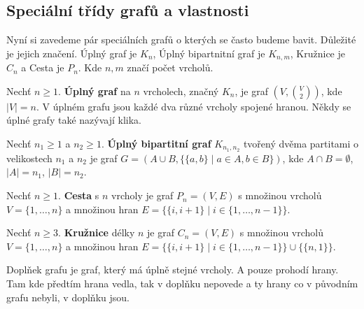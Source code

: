 \bigskip

\subsection{Speciální třídy grafů a vlastnosti}

Nyní si zavedeme pár speciálních grafů o kterých se často budeme bavit. Důležité je jejich značení. Úplný graf je $K_n$, Úplný bipartnitní graf je $K_{n,m}$, Kružnice je $C_n$ a Cesta je $P_n$. Kde $n,m$ značí počet vrcholů.

\medskip

\begin{definition}
Nechť $n \ge 1$. \textbf{Úplný graf} na $n$ vrcholech, značný $K_n$, je graf $(V, \binom{V}{2})$, kde $|V| = n$. V úplném grafu jsou každé dva různé vrcholy spojené hranou. Někdy se úplné grafy také nazývají klika.
\end{definition}



\bigskip

\begin{definition}
Nechť $n_1 \ge 1$ a $n_2 \ge 1$. \textbf{Úplný bipartitní graf} $K_{n_1,n_2}$ tvořený dvěma partitami o velikostech $n_1$ a $n_2$ je graf $G = (A \cup B, \{ \{a, b\} \mid a \in A, b \in B \})$, kde $A \cap B = \emptyset$, $|A| = n_1$, $|B| = n_2$.
\end{definition}

 
\bigskip

\begin{definition}[Cesta]
Nechť $n \geq 1$. \textbf{Cesta} s $n$ vrcholy je graf $P_n = (V,E)$ s množinou vrcholů 
$V = \{1, \dots, n\}$ a množinou hran $E = \{ \{i, i+1\} \mid i \in \{1, \dots, n-1\} \}$.
\end{definition}


\bigskip

\begin{definition}[Kružnice]
Nechť $n \geq 3$. \textbf{Kružnice} délky $n$ je graf $C_n = (V,E)$ s množinou vrcholů
$V = \{1, \dots, n\}$ a množinou hran $E = \{ \{i, i+1\} \mid i \in \{1, \dots, n-1\} \} \cup \{ \{n,1\} \}.$
\end{definition}


\bigskip

\noindent Doplňek grafu je graf, který má úplně stejné vrcholy. A pouze prohodí hrany. Tam kde předtím hrana vedla, tak v doplňku nepovede a ty hrany co v původním grafu nebyli, v doplňku jsou.

